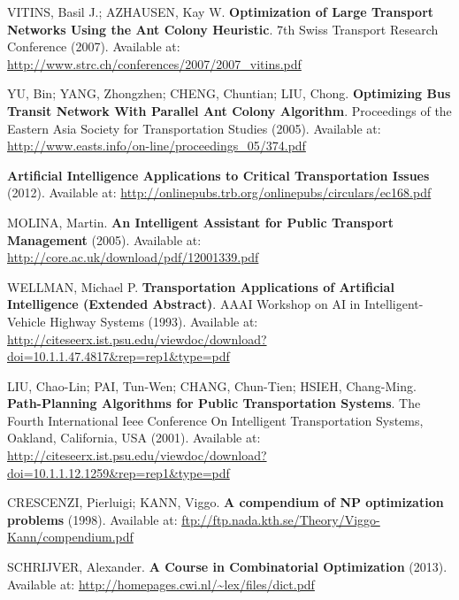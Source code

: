 \documentclass{article}
\begin{document}
\begin{thebibliography}{1}

VITINS, Basil J.; AZHAUSEN, Kay W. \textbf{Optimization of Large Transport Networks Using the Ant Colony Heuristic}. 7th Swiss Transport Research Conference (2007). Available at: \url{http://www.strc.ch/conferences/2007/2007_vitins.pdf}

YU, Bin; YANG, Zhongzhen; CHENG, Chuntian; LIU, Chong. \textbf{Optimizing Bus Transit Network With Parallel Ant Colony Algorithm}. Proceedings of the Eastern Asia Society for Transportation Studies (2005). Available at: \url{http://www.easts.info/on-line/proceedings_05/374.pdf}

\textbf{Artificial Intelligence Applications to Critical Transportation Issues} (2012). Available at: \url{http://onlinepubs.trb.org/onlinepubs/circulars/ec168.pdf}

MOLINA, Martin. \textbf{An Intelligent Assistant for Public Transport Management} (2005). Available at: \url{http://core.ac.uk/download/pdf/12001339.pdf}

WELLMAN, Michael P. \textbf{Transportation Applications of Artificial Intelligence (Extended Abstract)}. AAAI Workshop on AI in Intelligent-Vehicle Highway Systems (1993). Available at: \url{http://citeseerx.ist.psu.edu/viewdoc/download?doi=10.1.1.47.4817&rep=rep1&type=pdf}

LIU, Chao-Lin; PAI, Tun-Wen; CHANG, Chun-Tien; HSIEH, Chang-Ming. \textbf{Path-Planning Algorithms for Public Transportation Systems}. The Fourth International Ieee Conference On Intelligent Transportation Systems, Oakland, California, USA (2001). Available at: \url{http://citeseerx.ist.psu.edu/viewdoc/download?doi=10.1.1.12.1259&rep=rep1&type=pdf}

CRESCENZI, Pierluigi; KANN, Viggo. \textbf{A compendium of NP optimization problems} (1998). Available at: \url{ftp://ftp.nada.kth.se/Theory/Viggo-Kann/compendium.pdf}

SCHRIJVER, Alexander. \textbf{A Course in Combinatorial Optimization} (2013). Available at: \url{http://homepages.cwi.nl/~lex/files/dict.pdf}

\end{thebibliography}
\end{document}
